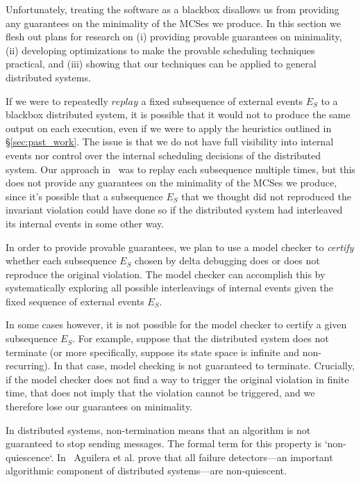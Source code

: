 Unfortunately, treating the software as a blackbox disallows us from
providing any guarantees on the minimality of the MCSes we produce.
In this section we flesh out plans for research on
(i) providing provable guarantees on minimality, (ii) developing optimizations
to make the provable scheduling techniques practical, and (iii) showing
that our techniques can be applied to general distributed systems.

 If we were to repeatedly
$replay$ a
fixed subsequence of external events $E_S$ to a blackbox distributed system,
it is possible that it would not to produce the same output on each
execution, even if we were to apply the heuristics outlined in
\S\ref{sec:past_work}. The issue is that we do not have full visibility into internal
events nor control over the internal scheduling decisions of the distributed
system. Our approach in~\cite{sts2014} was to
replay each subsequence multiple times, but this does not provide any
guarantees on the minimality of the MCSes we produce, since it's possible that
a subsequence $E_S$ that we thought did not reproduced the invariant violation
 could have done so if the
distributed system had interleaved its internal events in some other way.

In order to provide provable guarantees, we plan to use a model checker to
{\em certify} whether each subsequence $E_S$ chosen by delta debugging does or
does not reproduce the original violation. The model checker can accomplish this
by systematically exploring all possible interleavings of internal events
given the fixed sequence of external events $E_S$.

In some cases however, it is not possible for the model checker to certify a
given subsequence $E_S$. For example, suppose that the distributed system does
not terminate (or more specifically, suppose its state space is infinite
and non-recurring). In that case, model checking is not guaranteed to terminate.
Crucially, if the
model checker does not find a way to trigger the original violation in finite time,
that does not imply that the violation cannot be triggered, and we therefore lose our guarantees on minimality.

In distributed systems, non-termination means that an algorithm is not guaranteed to stop
sending messages. The formal term for this property is `non-quiescence`. In~\cite{aguilera1997heartbeat} Aguilera et al. prove that
all failure detectors---an important algorithmic component of distributed systems---are
non-quiescent.

